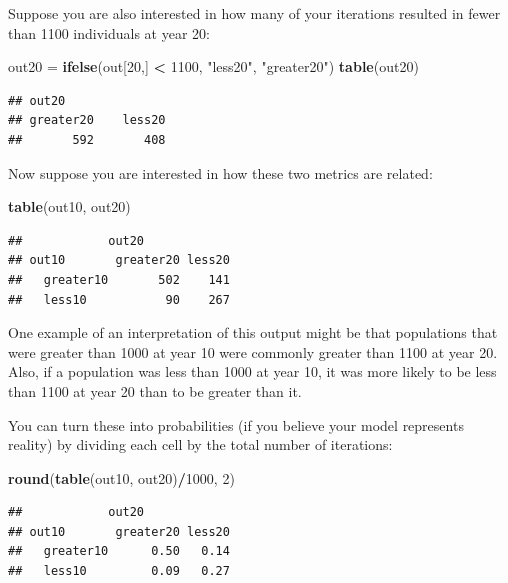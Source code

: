 \documentclass[]{book}
\newenvironment{Shaded}{\begin{snugshade}}{\end{snugshade}}
\newcommand{\KeywordTok}[1]{\textcolor[rgb]{0.13,0.29,0.53}{\textbf{#1}}}
\newcommand{\DecValTok}[1]{\textcolor[rgb]{0.00,0.00,0.81}{#1}}
\newcommand{\StringTok}[1]{\textcolor[rgb]{0.31,0.60,0.02}{#1}}
\newcommand{\OperatorTok}[1]{\textcolor[rgb]{0.81,0.36,0.00}{\textbf{#1}}}
\newcommand{\NormalTok}[1]{#1}
\theoremstyle{definition}
\theoremstyle{definition}
\theoremstyle{definition}
\theoremstyle{remark}
\begin{document}
Suppose you are also interested in how many of your iterations resulted
in fewer than 1100 individuals at year 20:

\begin{Shaded}
\begin{Highlighting}[]
\NormalTok{out20 =}\StringTok{ }\KeywordTok{ifelse}\NormalTok{(out[}\DecValTok{20}\NormalTok{,] }\OperatorTok{<}\StringTok{ }\DecValTok{1100}\NormalTok{, }\StringTok{"less20"}\NormalTok{, }\StringTok{"greater20"}\NormalTok{)}
\KeywordTok{table}\NormalTok{(out20)}
\end{Highlighting}
\end{Shaded}

\begin{verbatim}
## out20
## greater20    less20 
##       592       408
\end{verbatim}

Now suppose you are interested in how these two metrics are related:

\begin{Shaded}
\begin{Highlighting}[]
\KeywordTok{table}\NormalTok{(out10, out20)}
\end{Highlighting}
\end{Shaded}

\begin{verbatim}
##            out20
## out10       greater20 less20
##   greater10       502    141
##   less10           90    267
\end{verbatim}

One example of an interpretation of this output might be that
populations that were greater than 1000 at year 10 were commonly greater
than 1100 at year 20. Also, if a population was less than 1000 at year
10, it was more likely to be less than 1100 at year 20 than to be
greater than it.

You can turn these into probabilities (if you believe your model
represents reality) by dividing each cell by the total number of
iterations:

\begin{Shaded}
\begin{Highlighting}[]
\KeywordTok{round}\NormalTok{(}\KeywordTok{table}\NormalTok{(out10, out20)}\OperatorTok{/}\DecValTok{1000}\NormalTok{, }\DecValTok{2}\NormalTok{)}
\end{Highlighting}
\end{Shaded}

\begin{verbatim}
##            out20
## out10       greater20 less20
##   greater10      0.50   0.14
##   less10         0.09   0.27
\end{verbatim}
\end{document}
